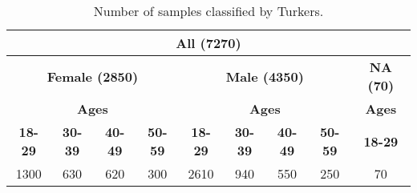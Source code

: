 \documentclass{article}
\begin{document}
\begin{table}[t!]
	\centering
	\caption{Number of samples classified by Turkers.}
	\label{table:WCount}
	\resizebox{\columnwidth}{!} {
		\begin{tabular}{|c|c|c|c|c|c|c|c|c|}
			\hline
			\multicolumn{9}{|c|}{{\bf All (7270)}}                                                                                       \\ \hline
			
			\multicolumn{4}{|c|}{{\bf Female (2850)}}                    & \multicolumn{4}{c|}{{\bf Male (4350)}}                       & {\bf NA (70)}    \\ \hline
			\multicolumn{4}{|c|}{{\bf Ages}}                      & \multicolumn{4}{c|}{{\bf Ages}}                       & {\bf Ages}  \\ \hline
			{\bf 18-29} & {\bf 30-39} & {\bf 40-49} & {\bf 50-59} & {\bf 18-29} & {\bf 30-39} & {\bf 40-49} & {\bf 50-59} & {\bf 18-29} \\ \hline
			1300         & 630          & 620          & 300          & 2610         & 940          & 550          & 250          & 70           \\ \hline
		\end{tabular}}
	\end{table}
\end{document}
